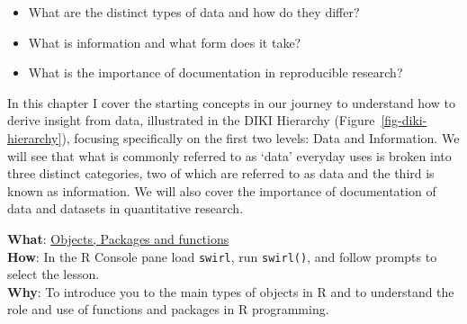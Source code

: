 \documentclass[
  letterpaper,
]{latex/krantz}
\providecommand{\tightlist}{%
  \setlength{\itemsep}{0pt}\setlength{\parskip}{0pt}}\usepackage{longtable,booktabs,array}
\begin{document}
\begin{tcolorbox}[enhanced jigsaw, toprule=.15mm, bottomtitle=1mm, coltitle=black, title=\textcolor{quarto-callout-note-color}{\faInfo}\hspace{0.5em}{Essential questions}, left=2mm, colframe=quarto-callout-note-color-frame, bottomrule=.15mm, colbacktitle=quarto-callout-note-color!10!white, leftrule=.75mm, colback=white, titlerule=0mm, breakable, toptitle=1mm, opacityback=0, arc=.35mm, rightrule=.15mm, opacitybacktitle=0.6]

\begin{itemize}
\tightlist
\item
  What are the distinct types of data and how do they differ?
\item
  What is information and what form does it take?
\item
  What is the importance of documentation in reproducible research?
\end{itemize}

\end{tcolorbox}

In this chapter I cover the starting concepts in our journey to
understand how to derive insight from data, illustrated in the DIKI
Hierarchy (Figure~\ref{fig-diki-hierarchy}), focusing specifically on
the first two levels: Data and Information. We will see that what is
commonly referred to as `data' everyday uses is broken into three
distinct categories, two of which are referred to as data and the third
is known as information. We will also cover the importance of
documentation of data and datasets in quantitative research.

\begin{tcolorbox}[enhanced jigsaw, toprule=.15mm, bottomtitle=1mm, coltitle=black, title=\textcolor{quarto-callout-tip-color}{\faLightbulb}\hspace{0.5em}{Interactive programming}, left=2mm, colframe=quarto-callout-tip-color-frame, bottomrule=.15mm, colbacktitle=quarto-callout-tip-color!10!white, leftrule=.75mm, colback=white, titlerule=0mm, breakable, toptitle=1mm, opacityback=0, arc=.35mm, rightrule=.15mm, opacitybacktitle=0.6]

\textbf{What}: \href{https://github.com/lin380/swirl}{Objects, Packages
and functions}\\
\textbf{How}: In the R Console pane load \texttt{swirl}, run
\texttt{swirl()}, and follow prompts to select the lesson.\\
\textbf{Why}: To introduce you to the main types of objects in R and to
understand the role and use of functions and packages in R programming.

\end{tcolorbox}
\end{document}

